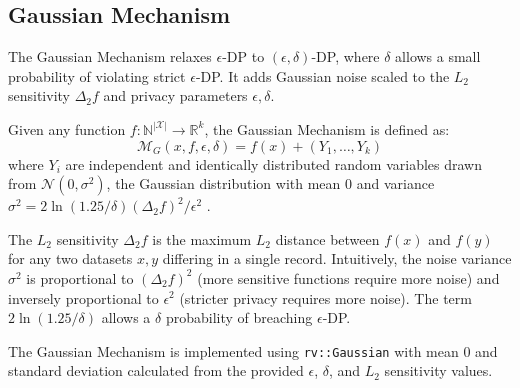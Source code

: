 \subsection{Gaussian Mechanism}
The Gaussian Mechanism relaxes $\epsilon$-DP to $(\epsilon,\delta)$-DP, where $\delta$ allows a small probability of violating strict $\epsilon$-DP. It adds Gaussian noise scaled to the $L_2$ sensitivity $\Delta_2 f$ and privacy parameters $\epsilon, \delta$.

\begin{definition}
Given any function $f: \mathbb{N}^{|\mathcal{X}|} \rightarrow \mathbb{R}^k$, the Gaussian Mechanism is defined as: 
\begin{equation}
\mathcal{M}_G(x, f, \epsilon, \delta) = f(x) + (Y_1, \ldots, Y_k)
\end{equation}
where $Y_i$ are independent and identically distributed random variables drawn from $\mathcal{N}(0, \sigma^2)$, the Gaussian distribution with mean 0 and variance $\sigma^2 = 2\ln(1.25/\delta)(\Delta_2 f)^2 / \epsilon^2$ \citep[Thm. 3.22]{Dwork2014}.
\end{definition}

The $L_2$ sensitivity $\Delta_2 f$ is the maximum $L_2$ distance between $f(x)$ and $f(y)$ for any two datasets $x, y$ differing in a single record. Intuitively, the noise variance $\sigma^2$ is proportional to $(\Delta_2 f)^2$ (more sensitive functions require more noise) and inversely proportional to $\epsilon^2$ (stricter privacy requires more noise). The term $2\ln(1.25/\delta)$ allows a $\delta$ probability of breaching $\epsilon$-DP.

The Gaussian Mechanism is implemented using \texttt{rv::Gaussian} with mean 0 and standard deviation calculated from the provided $\epsilon$, $\delta$, and $L_2$ sensitivity values.

